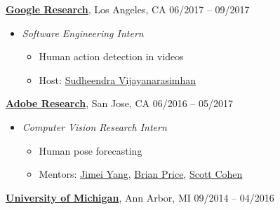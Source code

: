\documentclass[10pt]{article}
\newenvironment{innerlist}[1][\enskip\textbullet]%
        {\begin{itemize}[#1,leftmargin=*,parsep=0pt,itemsep=0pt,topsep=0pt,partopsep=0pt]}
        {\end{itemize}}
\begin{document}
\href{https://research.google.com/}{\textbf{Google Research}}, Los Angeles, CA \hfill {06/2017 -- 09/2017} \\
\vspace{-.15in}
\begin{innerlist}
\item[] \emph{Software Engineering Intern} \\
    \vspace{-.15in}
    \begin{innerlist}
    \item Human action detection in videos
    \item Host: \href{https://research.google.com/pubs/105363.html}{Sudheendra Vijayanarasimhan}
    \end{innerlist}
\end{innerlist}
\vspace{.1in}
\href{https://research.adobe.com/}{\textbf{Adobe Research}}, San Jose, CA \hfill {06/2016 -- 05/2017} \\
\vspace{-.15in}
\begin{innerlist}
\item[] \emph{Computer Vision Research Intern} \\
    \vspace{-.15in}
    \begin{innerlist}
    \item Human pose forecasting
    \item Mentors: \href{https://research.adobe.com/person/jimei-yang/}{Jimei Yang}, \href{https://research.adobe.com/person/brian-price/}{Brian Price}, \href{https://research.adobe.com/person/scott-cohen/}{Scott Cohen}
    \end{innerlist}
\end{innerlist}
\vspace{.1in}
\href{http://www.umich.edu}{\textbf{University of Michigan}}, Ann Arbor, MI \hfill {09/2014 -- 04/2016} \\
\vspace{-.15in}
\end{document}
